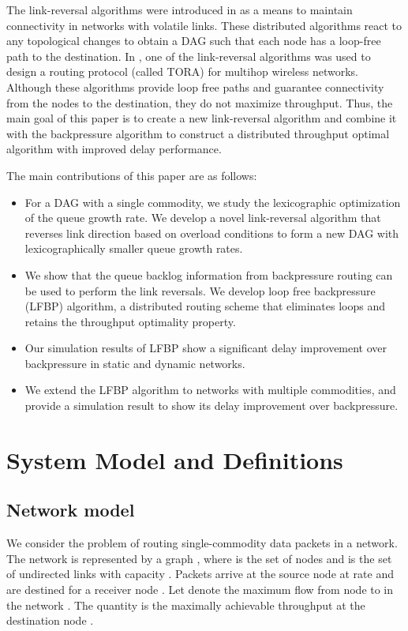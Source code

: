 \documentclass{sig-alternate-2013}
\begin{document}
The link-reversal algorithms were introduced in \cite{gafni_bertsekas} as a means to maintain connectivity in networks with volatile links.  These distributed algorithms react to any topological changes to obtain a DAG such that each node has a loop-free path  to the destination.  In \cite{tora}, one of the link-reversal algorithms was used to design a routing protocol (called TORA) for multihop wireless networks. Although these algorithms provide loop free paths and guarantee connectivity from the nodes to the destination, they do not maximize throughput. Thus, the main goal of this paper is to create a new link-reversal algorithm and combine it with the backpressure algorithm to construct a distributed throughput optimal algorithm with improved delay performance.


The main contributions of this paper are as follows:
\begin{itemize}
\itemsep0em 
\item  For a DAG with a single commodity, we study the  lexicographic optimization of the queue growth rate.
We develop a novel link-reversal algorithm that reverses link direction based on overload conditions to form a new DAG
with lexicographically smaller queue growth rates. 
\item We show that the queue backlog information from backpressure routing can be used to perform the link reversals. We develop loop free backpressure (LFBP) algorithm, a  distributed routing scheme  that eliminates loops and  retains the throughput optimality property.
\item Our simulation results of LFBP show a significant delay improvement over backpressure in static and dynamic networks. 
\item We extend the LFBP algorithm to networks with multiple commodities, and provide a simulation result to show its delay improvement over backpressure.
 \end{itemize}









\section{System Model and Definitions}
\subsection{Network model}
We consider the problem of routing single-commodity data packets in a network. The network is represented by a graph , where  is the set of nodes and  is the set of undirected links  with capacity . Packets arrive at the source node  at rate   and are destined for a receiver node .  Let  denote the maximum flow from node  to   in the network .
The quantity  is the maximally achievable throughput at the destination node . 
\end{document}
